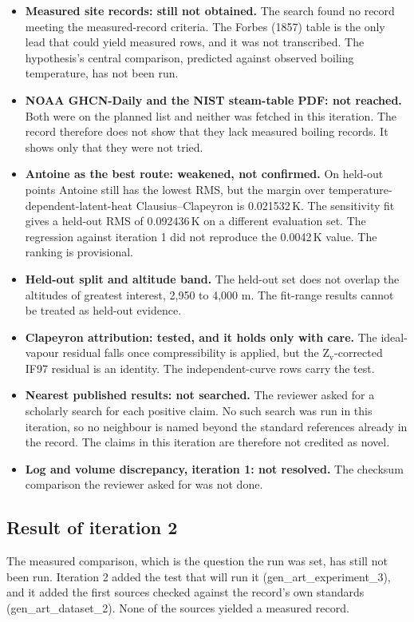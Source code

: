 \documentclass[11pt,letterpaper]{article}
\begin{document}
\begin{itemize}
\item \textbf{Measured site records: still not obtained.} The search found no record meeting the measured-record criteria. The Forbes (1857) table is the only lead that could yield measured rows, and it was not transcribed. The hypothesis's central comparison, predicted against observed boiling temperature, has not been run.
\item \textbf{NOAA GHCN-Daily and the NIST steam-table PDF: not reached.} Both were on the planned list and neither was fetched in this iteration. The record therefore does not show that they lack measured boiling records. It shows only that they were not tried.
\item \textbf{Antoine as the best route: weakened, not confirmed.} On held-out points Antoine still has the lowest RMS, but the margin over temperature-dependent-latent-heat Clausius--Clapeyron is 0.021532\,K. The sensitivity fit gives a held-out RMS of 0.092436\,K on a different evaluation set. The regression against iteration 1 did not reproduce the 0.0042\,K value. The ranking is provisional.
\item \textbf{Held-out split and altitude band.} The held-out set does not overlap the altitudes of greatest interest, 2,950 to 4,000 m. The fit-range results cannot be treated as held-out evidence.
\item \textbf{Clapeyron attribution: tested, and it holds only with care.} The ideal-vapour residual falls once compressibility is applied, but the Z$_\mathrm{v}$-corrected IF97 residual is an identity. The independent-curve rows carry the test.
\item \textbf{Nearest published results: not searched.} The reviewer asked for a scholarly search for each positive claim. No such search was run in this iteration, so no neighbour is named beyond the standard references already in the record. The claims in this iteration are therefore not credited as novel.
\item \textbf{Log and volume discrepancy, iteration 1: not resolved.} The checksum comparison the reviewer asked for was not done.
\end{itemize}

\subsection{Result of iteration 2}

The measured comparison, which is the question the run was set, has still not been run. Iteration 2 added the test that will run it (gen\_art\_experiment\_3), and it added the first sources checked against the record's own standards (gen\_art\_dataset\_2). None of the sources yielded a measured record.
\end{document}
